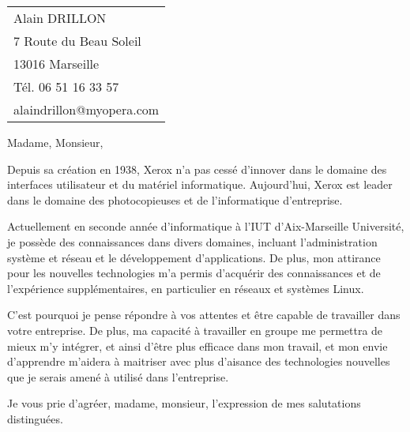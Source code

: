 \documentclass[11pt]{article}
\begin{document}
    \begin{tabular}{l}
        Alain DRILLON \\
        7 Route du Beau Soleil\\
        13016 Marseille\\
        Tél. 06 51 16 33 57\\
        alaindrillon@myopera.com
    \end{tabular}

    \vspace{2cm}

    Madame, Monsieur,
    \vspace{0.75cm}

    Depuis sa création en 1938, Xerox n'a pas cessé d'innover dans le domaine des interfaces utilisateur et du matériel informatique. Aujourd'hui, Xerox est leader dans le domaine des photocopieuses et de l'informatique d'entreprise.

    \vspace{0.75cm}
    Actuellement en seconde année d'informatique à l'IUT d'Aix-Marseille Université, je possède des connaissances dans divers domaines, incluant l'administration système et réseau et le développement d'applications.
    De plus, mon attirance pour les nouvelles technologies m'a permis d’acquérir des connaissances et de l'expérience supplémentaires, en particulier en réseaux et systèmes Linux.
   
   C'est pourquoi je pense répondre à vos attentes et être capable de travailler dans votre entreprise. De plus, ma capacité à travailler en groupe me permettra de mieux m'y intégrer, et ainsi d'être plus efficace dans mon travail, et mon envie d'apprendre m'aidera à maitriser avec plus d'aisance des technologies nouvelles que je serais amené à utilisé dans l'entreprise.

   \vspace{0.50cm}
   Je vous prie d'agréer, madame, monsieur, l'expression de mes salutations distinguées.
\end{document}
